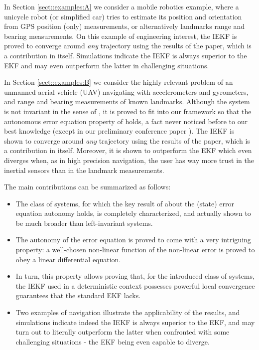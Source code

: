 \documentclass[a4paper,12pt,onecolumn]{article}
\begin{document}
In Section \ref{sect::examples:A} we consider a mobile robotics example, where a unicycle robot (or simplified car) tries to estimate its position and orientation from GPS position (only) measurements, or alternatively landmarks range and bearing measurements. On this example of engineering interest, the IEKF is proved to converge around \emph{any}  trajectory using the results of the paper, which is a contribution in itself. Simulations indicate the IEKF is always superior to the EKF and may even outperform the latter in challenging situations.  

In Section \ref{sect::examples:B} we consider the highly relevant problem of an unmanned aerial vehicle (UAV) navigating with accelerometers and gyrometers, and range and bearing measurements of known landmarks. Although the system is not invariant in the sense of \cite{bonnabel2008symmetry,bonnabel2009non}, it is proved to fit into our framework so that the  autonomous error equation property of \cite{bonnabel2009non}  holds, a fact never  noticed before to our best knowledge (except in our preliminary conference paper \cite{barrau-bonnabel-cdc14}). The IEKF is shown to converge around \emph{any} trajectory using the results of the paper, which is a contribution in itself. Moreover, it is shown to outperform the EKF which even  diverges when, as in high precision navigation, the user has way more trust in the inertial sensors  than in the landmark measurements. 




The  main contributions can be summarized as follows:
\begin{itemize}
\item The class of systems, for which the key result of \cite{bonnabel2009non} about the (state) error equation autonomy holds, is completely characterized, and actually shown to be much broader than left-invariant systems. 
\item The autonomy of the error equation is proved to come with a very intriguing property: a well-chosen non-linear function of the non-linear error is proved to obey a linear differential equation.
\item In turn, this property allows proving that, for the introduced class of systems, the IEKF used in a deterministic context possesses powerful local convergence guarantees that the standard EKF lacks. 
 \item Two examples of navigation illustrate the applicability of the results, and simulations indicate indeed the IEKF is always superior to the EKF, and may turn out to literally outperform the latter when confronted with some challenging situations - the EKF being even capable to diverge. 
\end{itemize}
\end{document}
